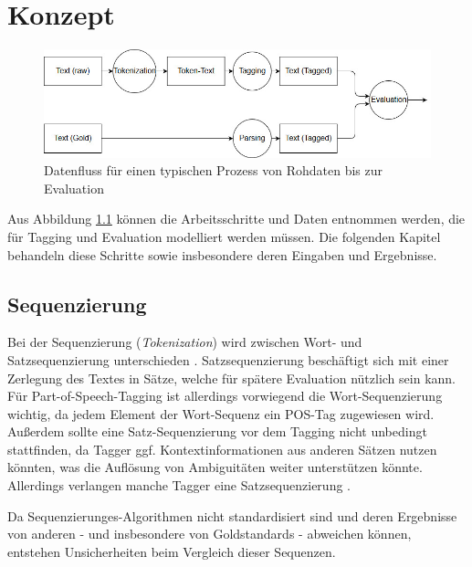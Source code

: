 %
\chapter{Konzept}
\label{sec:concept}



\begin{figure}[htb]
	\includegraphics[width=\textwidth]{gfx/Dataflow_concept.jpg}
	\caption{Datenfluss für einen typischen Prozess von Rohdaten bis zur Evaluation}
	\label{fig:concept:overview}
\end{figure}

Aus Abbildung \ref{fig:concept:overview} können die Arbeitsschritte und Daten entnommen werden, die für Tagging und Evaluation modelliert werden müssen. Die folgenden Kapitel behandeln diese Schritte sowie insbesondere deren Eingaben und Ergebnisse.

\section{Sequenzierung}
\label{sec:concept:sequence}
Bei der Sequenzierung (\textit{Tokenization}) wird zwischen Wort- und Satzsequenzierung unterschieden \cite{Smith}. Satzsequenzierung beschäftigt sich mit einer Zerlegung des Textes in Sätze, welche für spätere Evaluation nützlich sein kann. Für Part-of-Speech-Tagging ist allerdings vorwiegend die Wort-Sequenzierung wichtig, da jedem Element der Wort-Sequenz ein POS-Tag zugewiesen wird. Außerdem sollte eine Satz-Sequenzierung vor dem Tagging nicht unbedingt stattfinden, da Tagger ggf. Kontextinformationen aus anderen Sätzen nutzen könnten, was die Auflösung von Ambiguitäten weiter unterstützen könnte. Allerdings verlangen manche Tagger eine Satzsequenzierung \cite{paroubek}.

Da Sequenzierunges-Algorithmen nicht standardisiert sind \cite{paroubek} und deren Ergebnisse von anderen - und insbesondere von Goldstandards - abweichen können, entstehen Unsicherheiten beim Vergleich dieser Sequenzen. 

